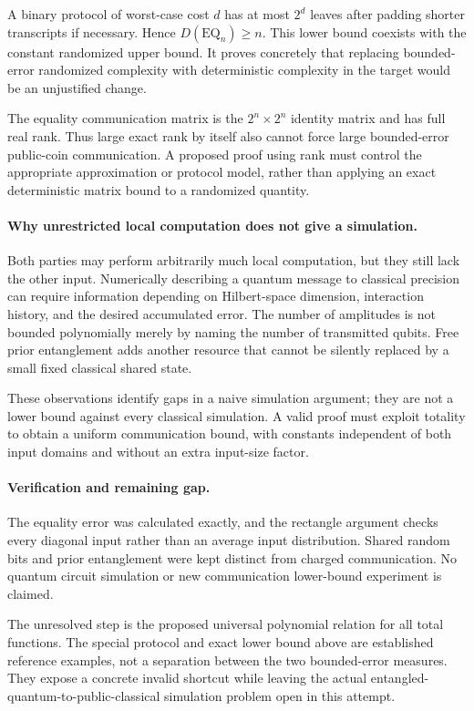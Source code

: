 \documentclass[11pt]{article}
\begin{document}
A binary protocol of worst-case cost $d$ has at most $2^d$ leaves after padding shorter transcripts if necessary. Hence $D(\mathrm{EQ}_n)\ge n$. This lower bound coexists with the constant randomized upper bound. It proves concretely that replacing bounded-error randomized complexity with deterministic complexity in the target would be an unjustified change.

The equality communication matrix is the $2^n\times2^n$ identity matrix and has full real rank. Thus large exact rank by itself also cannot force large bounded-error public-coin communication. A proposed proof using rank must control the appropriate approximation or protocol model, rather than applying an exact deterministic matrix bound to a randomized quantity.

\paragraph{Why unrestricted local computation does not give a simulation.}
Both parties may perform arbitrarily much local computation, but they still lack the other input. Numerically describing a quantum message to classical precision can require information depending on Hilbert-space dimension, interaction history, and the desired accumulated error. The number of amplitudes is not bounded polynomially merely by naming the number of transmitted qubits. Free prior entanglement adds another resource that cannot be silently replaced by a small fixed classical shared state.

These observations identify gaps in a naive simulation argument; they are not a lower bound against every classical simulation. A valid proof must exploit totality to obtain a uniform communication bound, with constants independent of both input domains and without an extra input-size factor.

\paragraph{Verification and remaining gap.}
The equality error was calculated exactly, and the rectangle argument checks every diagonal input rather than an average input distribution. Shared random bits and prior entanglement were kept distinct from charged communication. No quantum circuit simulation or new communication lower-bound experiment is claimed.

The unresolved step is the proposed universal polynomial relation for all total functions. The special protocol and exact lower bound above are established reference examples, not a separation between the two bounded-error measures. They expose a concrete invalid shortcut while leaving the actual entangled-quantum-to-public-classical simulation problem open in this attempt.
\end{document}
